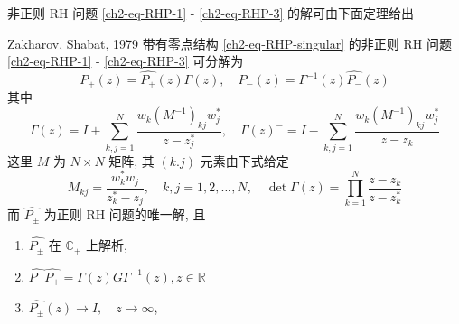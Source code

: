非正则 RH 问题 \eqref{ch2-eq-RHP-1} - \eqref{ch2-eq-RHP-3} 的解可由下面定理给出
\begin{theorem}{Zakharov, Shabat, 1979}
    带有零点结构 \eqref{ch2-eq-RHP-singular} 的非正则 RH 问题 \eqref{ch2-eq-RHP-1} - \eqref{ch2-eq-RHP-3} 可分解为
    \begin{equation}
        P_{+}(z) = \hat{P_{+}}(z) \Gamma(z) , \quad P_{-}(z) = \Gamma^{-1}(z) \hat{P_{-}}(z) \label{ch2-eq-RHP-decomposition}
    \end{equation}
    其中
    \begin{equation}
        \Gamma(z) = I + \sum_{k,j = 1}^{N} \frac{w_{k}(M^{-1})_{kj} w_{j}^{*}}{z - z_{j}^{*}}, \quad \Gamma(z)^{-} = I - \sum_{k,j = 1}^{N} \frac{w_{k}(M^{-1})_{kj} w_{j}^{*}}{z - z_{k}} \label{ch2-eq-Gamma}
    \end{equation}
    这里 $ M $ 为 $ N \times N $ 矩阵, 其 $ (k.j) $ 元素由下式给定
    \begin{equation}
        M_{kj} = \frac{w_{k}^{*}w_{j}}{z_{k}^{*} - z_{j}}, \quad k,j = 1,2, \dots, N, \quad \det \Gamma(z) = \prod_{k=1}^{N} \frac{z - z_{k}}{z - z_{k}^{*}}
    \end{equation}
    而 $ \hat{P_{\pm}} $ 为正则 RH 问题的唯一解, 且
    \begin{enumerate}
        \item $ \hat{P_{\pm}} $ 在 $ \mathbb{C_{+}} $ 上解析,
        \item $ \hat{P_{-}} \hat{P_{+}} = \Gamma(z) G \Gamma^{-1}(z), z \in \mathbb{R} $
        \item $ \hat{P_{\pm}}(z) \to I, \quad z \to \infty $,
    \end{enumerate}
\end{theorem}

